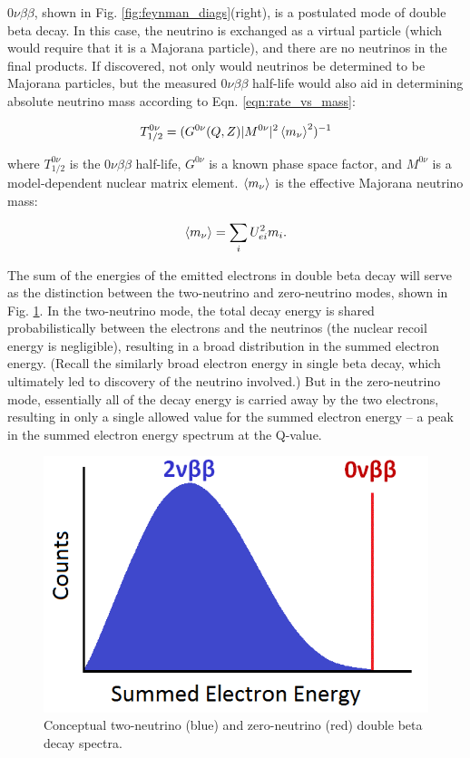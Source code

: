 $0\nu\beta\beta$, shown in Fig. \ref{fig:feynman_diags}(right), is a postulated mode of double beta decay. In this case, the neutrino is exchanged as a virtual particle (which would require that it is a Majorana particle), and there are no neutrinos in the final products. If discovered, not only would neutrinos be determined to be Majorana particles, but the measured $0\nu\beta\beta$ half-life would also aid in determining absolute neutrino mass according to Eqn. \ref{eqn:rate_vs_mass}:

\begin{equation}
T_{1/2}^{0\nu} = (G^{0\nu}(Q,Z)|M^{0\nu}|^{2}\braket{m_{\nu}}^{2})^{-1}
\label{eqn:rate_vs_mass}
\end{equation}

\noindent
where $T_{1/2}^{0\nu}$ is the $0\nu\beta\beta$ half-life,  $G^{0\nu}$ is a known phase space factor, and $M^{0\nu}$ is a model-dependent nuclear matrix element.  $\braket{m_{\nu}}$ is the effective Majorana neutrino mass:

\begin{equation}
\braket{m_{\nu}} = \sum\limits_{i} U_{ei}^{2} m_{i}.
\label{eqn:effectivemass}
\end{equation}

The sum of the energies of the emitted electrons in double beta decay will serve as the distinction between the two-neutrino and zero-neutrino modes, shown in Fig. \ref{fig:spectrum_bb}. In the two-neutrino mode, the total decay energy is shared probabilistically between the electrons and the neutrinos (the nuclear recoil energy is negligible), resulting in a broad distribution in the summed electron energy. (Recall the similarly broad electron energy in single beta decay, which ultimately led to discovery of the neutrino involved.) But in the zero-neutrino mode, essentially all of the decay energy is carried away by the two electrons, resulting in only a single allowed value for the summed electron energy -- a peak in the summed electron energy spectrum at the Q-value. 

\begin{figure} %
        \centering
                \includegraphics[width=.5\textwidth]{figures/spectrum_bb.png}
                \caption{Conceptual two-neutrino (blue) and zero-neutrino (red) double beta decay spectra.}
\label{fig:spectrum_bb}
\end{figure}

